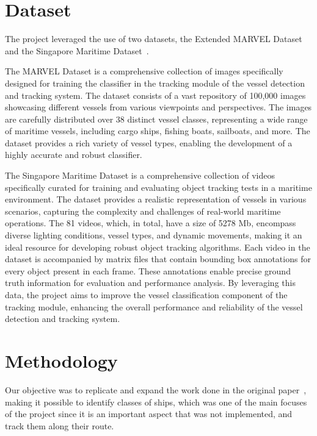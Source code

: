 \documentclass[a4paper,12pt]{article}
\begin{document}
\begin{multicols}{2}
\section{Dataset}\label{sec:dataset}
The project leveraged the use of two datasets, the Extended MARVEL Dataset~\cite{MARVEL} and the Singapore Maritime Dataset~\cite{SINGAPORE}.

The MARVEL Dataset is a comprehensive collection of images specifically designed for training the classifier in the tracking module of the vessel detection and tracking system.
The dataset consists of a vast repository of 100,000 images showcasing different vessels from various viewpoints and perspectives.
The images are carefully distributed over 38 distinct vessel classes, representing a wide range of maritime vessels, including cargo ships, fishing boats, sailboats, and more.
The dataset provides a rich variety of vessel types, enabling the development of a highly accurate and robust classifier.

The Singapore Maritime Dataset is a comprehensive collection of videos specifically curated for training and evaluating object tracking tests in a maritime environment.
The dataset provides a realistic representation of vessels in various scenarios, capturing the complexity and challenges of real-world maritime operations.
The 81 videos, which, in total, have a size of 5278 Mb, encompass diverse lighting conditions, vessel types, and dynamic movements, making it an ideal resource for developing robust object tracking algorithms.
Each video in the dataset is accompanied by matrix files that contain bounding box annotations for every object present in each frame.
These annotations enable precise ground truth information for evaluation and performance analysis.
By leveraging this data, the project aims to improve the vessel classification component of the tracking module, enhancing the overall performance and reliability of the vessel detection and tracking system.

\section{Methodology}\label{sec:methodology}
Our objective was to replicate and expand the work done in the original paper~\cite{MVDTHME}, making it possible to identify classes of ships, which was one of the main focuses of the project since it is an important aspect that was not implemented, and track them along their route.


\end{multicols}
\end{document}
